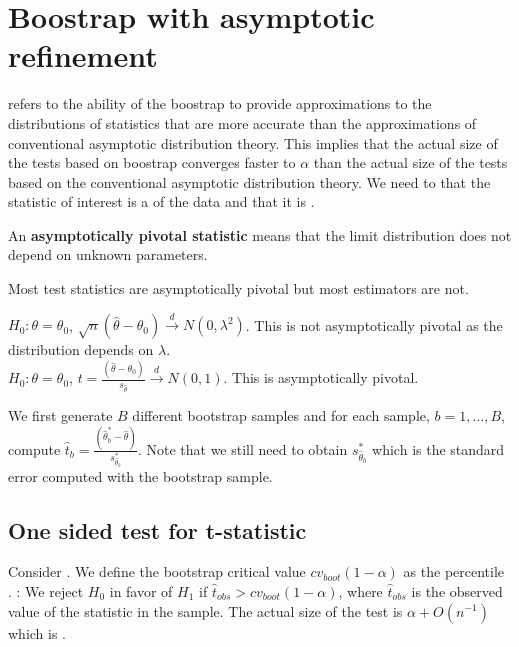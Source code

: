 \section{Boostrap with asymptotic refinement}

 refers to the ability of the boostrap to provide approximations to the distributions of statistics that are more accurate than the approximations of conventional asymptotic distribution theory.
This implies that the actual size of the tests based on boostrap converges faster to $\alpha$ than the actual size of the tests based on the conventional asymptotic distribution theory.
We need to  that the statistic of interest is a  of the data and that it is .
\begin{definition}
    An \textbf{asymptotically pivotal statistic} means that the limit distribution does not depend on unknown parameters.
\end{definition}
Most test statistics are asymptotically pivotal but most estimators are not.
\begin{Example}
    $H_0: \theta = \theta_0$, $\sqrt{n}(\hat{\theta} - \theta_0)\xrightarrow{d} N(0,\lambda^2)$. This is not asymptotically pivotal as the distribution depends on $\lambda$.\\
    $H_0: \theta = \theta_0$, $t = \frac{(\hat{\theta} - \theta_0)}{s_{\hat{\theta}}}\xrightarrow{d} N(0,1)$. This is asymptotically pivotal.
\end{Example}

We first generate $B$ different bootstrap samples and for each sample, $b=1,\ldots,B$, compute $\hat{t}_b = \frac{(\hat{\theta}^*_{b}-\hat{\theta})}{s^*_{\hat{\theta}_b}}$.
Note that we still need to obtain $s^*_{\hat{\theta}_b}$ which is the standard error computed with the bootstrap sample.

\subsection{One sided test for t-statistic}

Consider .
We define the bootstrap critical value $cv_{boot}(1-\alpha)$ as the percentile .
: We reject $H_0$ in favor of $H_1$ if $\hat{t}_{obs}>cv_{boot}(1-\alpha)$, where $\hat{t}_{obs}$ is the observed value of the statistic in the sample.
The actual size of the test is $\alpha + O(n^{-1})$ which is .

